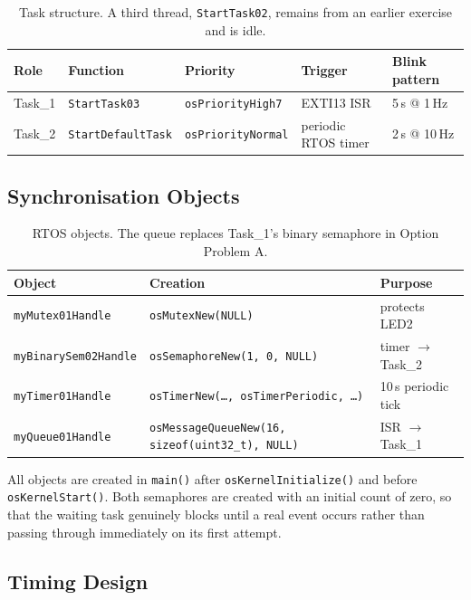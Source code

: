 \documentclass[11pt,a4paper]{article}
\begin{document}
\begin{table}[h]
\centering
\begin{tabular}{lllll}
\toprule
Role & Function & Priority & Trigger & Blink pattern \\
\midrule
Task\_1 & \texttt{StartTask03}      & \texttt{osPriorityHigh7} & EXTI13 ISR        & 5\,s @ 1\,Hz \\
Task\_2 & \texttt{StartDefaultTask} & \texttt{osPriorityNormal}& periodic RTOS timer & 2\,s @ 10\,Hz \\
\bottomrule
\end{tabular}
\caption{Task structure. A third thread, \texttt{StartTask02}, remains from an
earlier exercise and is idle.}
\end{table}

\subsection{Synchronisation Objects}

\begin{table}[h]
\centering
\begin{tabular}{lll}
\toprule
Object & Creation & Purpose \\
\midrule
\texttt{myMutex01Handle}      & \texttt{osMutexNew(NULL)}                  & protects LED2 \\
\texttt{myBinarySem02Handle}  & \texttt{osSemaphoreNew(1, 0, NULL)}        & timer $\rightarrow$ Task\_2 \\
\texttt{myTimer01Handle}      & \texttt{osTimerNew(\ldots, osTimerPeriodic, \ldots)} & 10\,s periodic tick \\
\texttt{myQueue01Handle}      & \texttt{osMessageQueueNew(16, sizeof(uint32\_t), NULL)} & ISR $\rightarrow$ Task\_1 \\
\bottomrule
\end{tabular}
\caption{RTOS objects. The queue replaces Task\_1's binary semaphore in
Option Problem A.}
\end{table}

All objects are created in \texttt{main()} after \texttt{osKernelInitialize()}
and before \texttt{osKernelStart()}. Both semaphores are created with an
initial count of zero, so that the waiting task genuinely blocks until a real
event occurs rather than passing through immediately on its first attempt.

\subsection{Timing Design}
\end{document}
